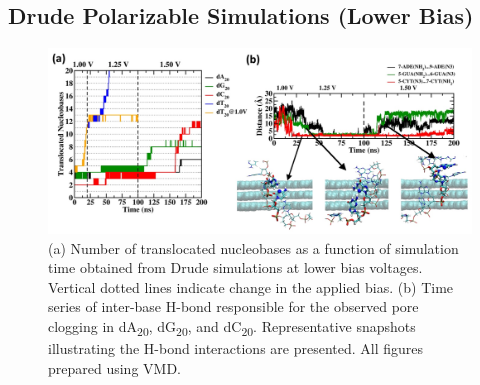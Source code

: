 \subsection[Drude Polarizable Simulations (Lower Bias)]{Drude Polarizable Simulations (Lower Bias)}
\begin{figure}
    \centering
    \includegraphics[width=\textwidth]{Chapter4/Figures/Figure5.png}
    \caption[DNA translocation through nanopores in a three-layer graphene membrane in Drude polarizable FF at lower voltages]{(a) Number of translocated nucleobases as a function of simulation time obtained from Drude simulations at lower bias voltages. Vertical dotted lines indicate change in the applied bias. (b) Time series of inter-base H-bond responsible for the observed pore clogging in dA\textsubscript{20}, dG\textsubscript{20}, and dC\textsubscript{20}. Representative snapshots illustrating the H-bond interactions are presented. All figures prepared using VMD.\supercite{humphrey_vmd_1996}}
\end{figure}

